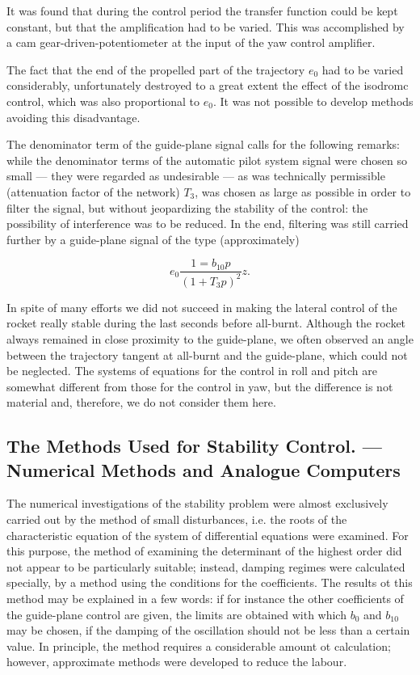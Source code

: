 \documentclass[12pt, a4paper]{article}
\begin{document}
It was found that during the control period the transfer function could be kept constant, but that the amplification had to be varied. This was accomplished by a cam gear-driven-potentiometer at the input of the yaw control amplifier.

The fact that the end of the propelled part of the trajectory $e_{0}$ had to be varied considerably, unfortunately destroyed to a great extent the effect of the isodromc control, which was also proportional to $e_{0}$. It was not possible to develop methods avoiding this disadvantage.

The denominator term of the guide-plane signal calls for the following remarks: while the denominator terms of the automatic pilot system signal were chosen so small — they were regarded as undesirable — as was technically permissible (attenuation factor of the network) $T_{3}$, was chosen as large as possible in order to filter the signal, but without jeopardizing the stability of the control: the possibility of interference was to be reduced. In the end, filtering was still carried further by a guide-plane signal of the type (approximately)

\begin{equation}
  e_{0}\frac{1=b_{10}p}{(1+T_{3}p)^{2}}z.
\end{equation}

In spite of many efforts we did not succeed in making the lateral control of the rocket really stable during the last seconds before all-burnt. Although the rocket always remained in close proximity to the guide-plane, we often observed an angle between the trajectory tangent at all-burnt and the guide-plane, which could not be neglected. The systems of equations for the control in roll and pitch are somewhat different from those for the control in yaw, but the difference is not material and, therefore, we do not consider them here.

\subsection{The Methods Used for Stability Control. — Numerical Methods and Analogue Computers}

The numerical investigations of the stability problem were almost exclusively carried out by the method of small disturbances, i.e. the roots of the characteristic equation of the system of differential equations were examined. For this purpose, the method of examining the determinant of the highest order did not appear to be particularly suitable; instead, damping regimes were calculated specially, by a method using the conditions for the coefficients. The results ot this method may be explained in a few words: if for instance the other coefficients of the guide-plane control are given, the limits are obtained with which $b_{0}$ and $b_{10}$ may be chosen, if the damping of the oscillation should not be less than a certain value. In principle, the method requires a considerable amount ot calculation; however, approximate methods were developed to reduce the labour.
\end{document}
